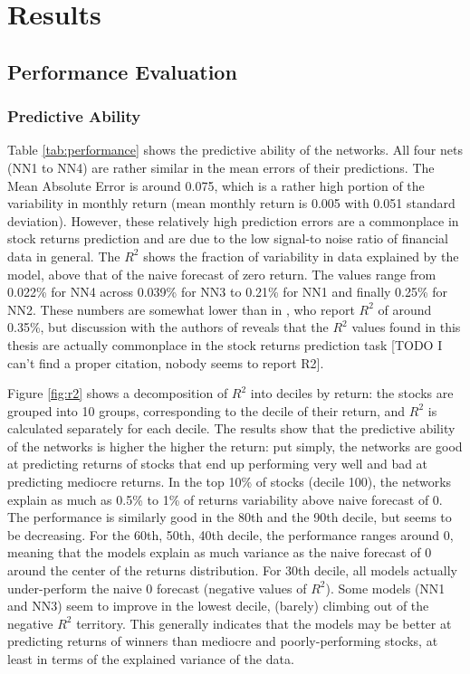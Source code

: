 \chapter{Results}
\label{chap:res}

\section{Performance Evaluation}
	
	\subsection{Predictive Ability}
		\label{chap:predictive_ability}
	
		Table \ref{tab:performance} shows the predictive ability of the networks. All four nets (NN1 to NN4) are rather similar in the mean errors of their predictions. The Mean Absolute Error is around 0.075, which is a rather high portion of the variability in monthly return (mean monthly return is 0.005 with 0.051 standard deviation).  However, these relatively high prediction errors are a commonplace in stock returns prediction and are due to the low signal-to noise ratio of financial data in general. The $R^2$ shows the fraction of variability in data explained by the model, above that of the naive forecast of zero return. The values range from 0.022\% for NN4 across 0.039\% for NN3 to 0.21\% for NN1 and finally 0.25\% for NN2. These numbers are somewhat lower than in \cite{gu2020empirical}, who report $R^2$ of around 0.35\%, but discussion with the authors of \cite{tobek2020does} reveals that the $R^2$ values found in this thesis are actually commonplace in the stock returns prediction task [TODO I can't find a proper citation, nobody seems to report R2].    
		
		Figure \ref{fig:r2} shows a decomposition of $R^2$ into deciles by return: the stocks are grouped into 10 groups, corresponding to the decile of their return, and $R^2$ is calculated separately for each decile. The results show that the predictive ability of the networks is higher the higher the return: put simply, the networks are good at predicting returns of stocks that end up performing very well and bad at predicting mediocre returns. In the top 10\% of stocks (decile 100), the networks explain as much as  0.5\% to 1\% of returns variability above naive forecast of 0. The performance is similarly good in the 80th and the 90th decile, but seems to be decreasing. For the 60th, 50th, 40th decile, the performance ranges around 0, meaning that the models explain as much variance as the naive forecast of 0 around the center of the returns distribution. For 30th decile, all models actually under-perform the naive 0 forecast (negative values of $R^2$). Some models (NN1 and NN3) seem to improve in the lowest decile, (barely) climbing out of the negative $R^2$ territory. This generally indicates that the models may be better at predicting returns of winners than mediocre and poorly-performing stocks, at least in terms of the explained variance of the data.    
		
